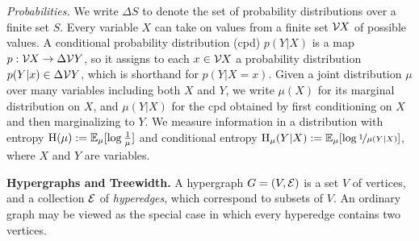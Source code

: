 \documentclass[twoside]{article}
\begin{document}
\textit{Probabilities.}
We write $\Delta S$ to denote the set of probability distributions over a finite set $S$.
Every variable $X$ can take on values from a finite set $\mathcal V\mskip-1mu X$ of possible values. 
A conditional probability distribution (cpd) $p(Y|X)$ is a map 
$p : \mathcal V\mskip-1mu  X \to \Delta \mathcal V Y$, so it assigns to each $x \in \mathcal V\mskip-1mu X$ a
probability distribution $p(Y|x) \in \Delta \mathcal V Y$, which is shorthand for $p(Y|X\!\!=\!x)$.
Given a joint distribution $\mu$ over many variables including both $X$ and $Y$, 
we write $\mu(X)$ for its marginal distribution on $X$,
and $\mu(Y|X)$ for the cpd obtained by first conditioning on $X$ and then marginalizing to $Y$. 
We measure information in a distribution with entropy $\operatorname{\mathrm{H}}(\mu) := \operatorname*{\mathbb{E}}_{\mu} [\log \frac1\mu]$ and conditional entropy $\operatorname{\mathrm{H}}_\mu(Y|X) := \operatorname*{\mathbb{E}}_\mu[\log\nicefrac1{\mu(Y|X)}]$, where $X$ and $Y$ are variables.



\textbf{Hypergraphs and Treewidth.}
A hypergraph $G = (V, \mathcal E)$ is a set $V$ of vertices, and a collection $\mathcal E$ of \emph{hyperedges}, which correspond to subsets of $V$. 
An ordinary graph may be viewed as the special case in which every hyperedge contains  two vertices.
\end{document}
